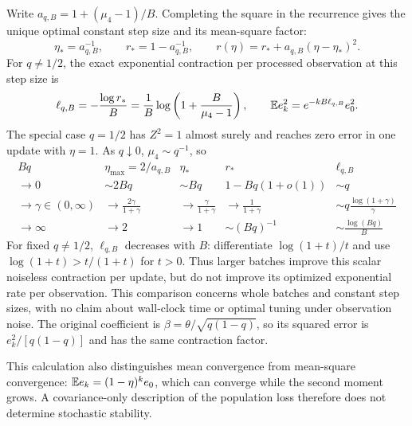 Write $a_{q,B} = 1 + (\mu_4 - 1)/B$. Completing the square in the recurrence
gives the unique optimal constant step size and its mean-square factor:
\[
 \eta_* = a_{q,B}^{-1},\qquad r_*
        = 1 - a_{q,B}^{-1},\qquad r(\eta)
        = r_* + a_{q,B}(\eta - \eta_*)^2.
\]
For $q \ne 1/2$, the exact exponential contraction per processed observation at
this step size is
\begin{equation}
 \label{eq:scalar-observation-rate}
 \ell_{q,B} = -\frac{\log r_*}{B}
            = \frac1B\log\left( 1 + \frac{B}{\mu_4 - 1} \right),\qquad \mathbb{E} e_k^2
            = e^{-kB\ell_{q,B}}e_0^2.
\end{equation}
The special case $q = 1/2$ has $Z^2 = 1$ almost surely and reaches zero error in
one update with $\eta = 1$. As $q \downarrow 0$, $\mu_4 \sim q^{-1}$, so
\[
 \begin{array}{c|c|c|c|c}
             Bq             &    \eta_{\max} = 2/a_{q,B}     &            \eta_*             &          r_*           &              \ell_{q,B}               \\
  \hline
            \to 0           &            \sim 2Bq            &            \sim Bq            &    1 - Bq(1 + o(1))    &                \sim q                 \\
  \to \gamma \in (0,\infty) & \to \frac{2\gamma}{1 + \gamma} & \to \frac{\gamma}{1 + \gamma} & \to \frac1{1 + \gamma} & \sim q\frac{\log(1 + \gamma)}{\gamma} \\
         \to \infty         &             \to 2              &             \to 1             &     \sim (Bq)^{-1}     &        \sim \frac{\log(Bq)}{B}
 \end{array}
\]
For fixed $q \ne 1/2$, $\ell_{q,B}$ decreases with $B$: differentiate
$\log(1 + t)/t$ and use $\log(1 + t) > t/(1 + t)$ for $t > 0$. Thus larger
batches improve this scalar noiseless contraction per update, but do not improve
its optimized exponential rate per observation. This comparison concerns whole
batches and constant step sizes, with no claim about wall-clock time or optimal
tuning under observation noise. The original coefficient is
$\beta = \theta/\sqrt{q(1 - q)}$, so its squared error is $e_k^2/[q(1 - q)]$ and
has the same contraction factor.

This calculation also distinguishes mean convergence from mean-square
convergence: $\mathbb{E} e_k = (1 - \eta)^k e_0$, which can converge while the second
moment grows. A covariance-only description of the population loss therefore
does not determine stochastic stability.

